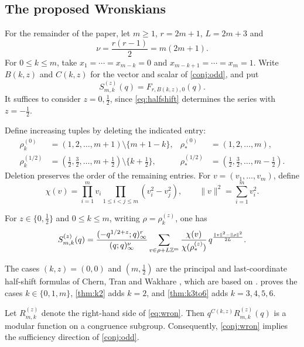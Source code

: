 \subsection{The proposed Wronskians}
For the remainder of the paper, let $m\ge1$, $r=2m+1$, $L=2m+3$ and
\[
\nu=\frac{r(r-1)}2=m(2m+1).
\]
For $0\le k\le m$, take $x_1=\cdots=x_{m-k}=0$ and $x_{m-k+1}=\cdots=x_m=1$. Write $B(k,z)$ and $C(k,z)$ for the vector and scalar of \cref{conj:odd}, and put
\[
S^{(z)}_{m,k}(q)=F_{r,B(k,z),0}(q).
\]
It suffices to consider $z=0,\frac12$, since \eqref{eq:halfshift} determines the series with $z=-\frac12$.

Define increasing tuples by deleting the indicated entry:
\begin{align*}
\rho^{(0)}_k&=(1,2,\dots,m+1)\setminus\{m+1-k\}, & \rho^{(0)}_*&=(1,2,\dots,m),\\
\rho^{(1/2)}_k&=(\tfrac12,\tfrac32,\dots,m+\tfrac12)\setminus\{k+\tfrac12\}, & \rho^{(1/2)}_*&=(\tfrac12,\tfrac32,\dots,m-\tfrac12).
\end{align*}
Deletion preserves the order of the remaining entries. For $v=(v_1,\dots,v_m)$, define
\[
\chi(v)=\prod_{i=1}^mv_i\prod_{1\le i<j\le m}(v_i^2-v_j^2),\qquad \|v\|^2=\sum_{i=1}^mv_i^2.
\]

\begin{conjecture}\label{conj:wron}
For $z\in\{0,\frac12\}$ and $0\le k\le m$, writing $\rho=\rho^{(z)}_k$, one has
\begin{equation}\label{eq:wron}
S^{(z)}_{m,k}(q)=\frac{(-q^{1/2+z};q)_\infty^r}{(q;q)_\infty^\nu}\sum_{v\in\rho+L\mathbb{Z}^m}\frac{\chi(v)}{\chi(\rho^{(z)}_*)}\,q^{\frac{\|v\|^2-\|\rho\|^2}{2L}}.
\end{equation}
\end{conjecture}

The cases $(k,z)=(0,0)$ and $(m,\frac12)$ are the principal and last-coordinate half-shift formulas of Chern, Tran and Wakhare \cite[Theorem~1.4]{CTW26}, which are based on \cite{BW15}.  proves the cases $k\in\{0,1,m\}$, \cref{thm:k2} adds $k=2$, and \cref{thm:k3to6} adds $k=3,4,5,6$.

\begin{proposition}\label{prop:rhs-modular}
Let $R^{(z)}_{m,k}$ denote the right-hand side of \eqref{eq:wron}. Then $q^{C(k,z)}R^{(z)}_{m,k}(q)$ is a modular function on a congruence subgroup. Consequently, \cref{conj:wron} implies the sufficiency direction of \cref{conj:odd}.
\end{proposition}

